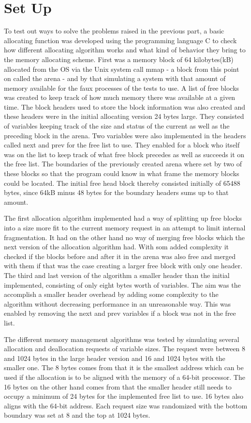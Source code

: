 \documentclass{article}
\begin{document}
\section{Set Up}\label{setup}
To test out ways to solve the problems raised in the previous part, a basic allocating function was developed using the programming language 
C to check how different allocating algorithm works and what kind of behavior they bring to the memory allocating scheme. 
First was a memory block of 64 kilobytes(kB) allocated from the OS via the Unix system call mmap - a block from this point on called 
the arena - and by that simulating a system with that amount of memory available for the faux processes of the tests to use. 
A list of free blocks was created to keep track of how much memory there was available at a given time. The block headers used to store 
the block information was also created and these headers were in the initial allocating version 24 bytes large. They consisted of 
variables keeping track of the size and status of the current as well as the preceding block in the arena. Two variables were 
also implemented in the headers called next and prev for the free list to use. They enabled for a block who itself was on the list 
to keep track of what free block precedes as well as succeeds it on the free list. The boundaries of the previously created arena 
where set by two of these blocks so that the program could know in what frame the memory blocks could be located. The initial free 
head block thereby consisted initially of 65488 bytes, since 64kB minus 48 bytes for the boundary headers sums up to that amount.


The first allocation algorithm implemented had a way of splitting up free blocks into a size more fit to the current memory 
request in an attempt to limit internal fragmentation. It had on the other hand no way of merging free blocks which the 
next version of the allocation algorithm had. With som added complexity it checked if the blocks before and after it in the arena 
was also free and merged with them if that was the case creating a larger free block with only one header. 
The third and last version of the algorithm a smaller header than the initial implemented, consisting of only eight bytes
worth of variables. The aim was the accomplish a smaller header overhead by adding some complexity to the algorithm without decreasing 
performance in an unreasonable way. This was enabled by removing the next and prev variables if a block was not in the free list. 

The different memory management algorithms was tested by simulating several allocation and deallocation requests of variable sizes. The request were 
between 8 and 1024 bytes in the large header version and 16 and 1024 bytes with the smaller one. The 8 bytes comes from that it is the smallest 
address which can be used if the allocation is to be aligned with the memory of a 64-bit processor. The 16 bytes on the other hand
comes from that the smaller header still needs to occupy a minimum of 24 bytes for the implemented free list to use. 16 bytes also aligns with 
the 64-bit address. Each request size was randomized with the bottom boundary was set at 8 and the top at 1024 bytes. 
\end{document}

